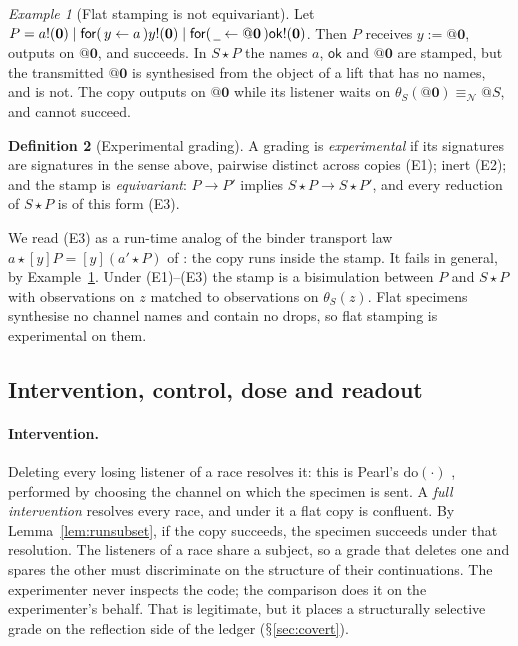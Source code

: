 \documentclass[11pt]{article}
\makeatletter
\theoremstyle{definition}
\newtheorem{definition}{Definition}[section]
\theoremstyle{plain}
\theoremstyle{remark}
\newtheorem{example}[definition]{Example}
\newcommand{\quo}[1]{@#1}
\newcommand{\inp}[3]{\mathsf{for}(\,#1 \leftarrow #2\,)#3}
\newcommand{\out}[2]{#1!(#2)}
\newcommand{\nequiv}{\equiv_{\mathcal{N}}}
\newcommand{\nil}{\mathbf{0}}
\newcommand{\wild}{\mathord{\underline{\hspace{0.5em}}}}
\DeclareRobustCommand{\S}{\ifmmode\mathsection\else$\mathsection$\fi}
\newcommand{\ok}{\mathsf{ok}}
\newcommand{\act}{\mathbin{\star}}
\makeatother
\begin{document}
\begin{example}[Flat stamping is not equivariant]\label{ex:nonequivariant}
Let $P = \out{a}{\nil} \mid \inp{y}{a}{\out{y}{\nil}} \mid
\inp{\wild}{\quo{\nil}}{\out{\ok}{\nil}}$. Then $P$ receives $y :=
\quo{\nil}$, outputs on $\quo{\nil}$, and succeeds. In $S \act P$ the
names $a$, $\ok$ and $\quo{\nil}$ are stamped, but the transmitted
$\quo{\nil}$ is synthesised from the object of a lift that has no names,
and is not. The copy outputs on $\quo{\nil}$ while its listener waits on
$\theta_S(\quo{\nil}) \nequiv \quo{S}$, and cannot succeed.
\end{example}

\begin{definition}[Experimental grading]\label{def:expgrading}
A grading is \emph{experimental} if its signatures are signatures in the
sense above, pairwise distinct across copies (E1); inert (E2); and the
stamp is \emph{equivariant}: $P \to P'$ implies $S \act P \to S \act P'$,
and every reduction of $S \act P$ is of this form (E3).
\end{definition}

We read (E3) as a run-time analog of the binder transport law $a \act
[y]P = [y](a' \act P)$ of \cite{FuzzyRho}: the copy runs inside the stamp.
It fails in general, by Example~\ref{ex:nonequivariant}. Under
(E1)--(E3) the stamp is a bisimulation between $P$ and $S \act P$ with
observations on $z$ matched to observations on $\theta_S(z)$. Flat
specimens synthesise no channel names and contain no drops, so flat
stamping is experimental on them.

\subsection{Intervention, control, dose and readout}

\paragraph{Intervention.} Deleting every losing listener of a race
resolves it: this is Pearl's $\mathrm{do}(\cdot)$ \cite{Pearl09},
performed by choosing the channel on which the specimen is sent. A
\emph{full intervention} resolves every race, and under it a flat copy is
confluent. By Lemma~\ref{lem:runsubset}, if the copy succeeds, the
specimen succeeds under that resolution. The listeners of a race share a
subject, so a grade that deletes one and spares the other must
discriminate on the structure of their continuations. The experimenter
never inspects the code; the comparison does it on the experimenter's
behalf. That is legitimate, but it places a structurally selective grade
on the reflection side of the ledger (\S\ref{sec:covert}).
\end{document}
